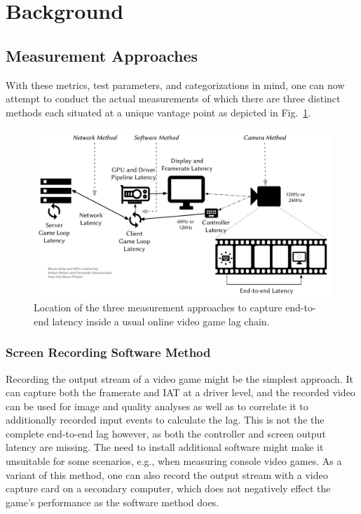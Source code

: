 \section{Background}
\label{sec:background}


\subsection{Measurement Approaches}
\label{sec:measurementapproaches}

With these metrics, test parameters, and categorizations in mind, one can now attempt to conduct the actual measurements of which there are three distinct methods each situated at a unique vantage point as depicted in Fig.~\ref{fig:measurement-methods}.

\begin{figure}[!t]
    \centering
    \includegraphics[width=1.0\columnwidth]{../models/e2e-lag.pdf}
    \caption{Location of the three measurement approaches to capture end-to-end latency inside a usual online video game lag chain.}
\label{fig:measurement-methods}
\end{figure}


\subsubsection{Screen Recording Software Method}

Recording the output stream of a video game might be the simplest approach. It can capture both the framerate and \gls{IAT} at a driver level, and the recorded video can be used for image and quality analyses as well as to correlate it to additionally recorded input events to calculate the lag. This is not the the complete end-to-end lag however, as both the controller and screen output latency are missing. The need to install additional software might make it unsuitable for some scenarios, e.g., when measuring console video games. As a variant of this method, one can also record the output stream with a video capture card on a secondary computer, which does not negatively effect the game's performance as the software method does.

